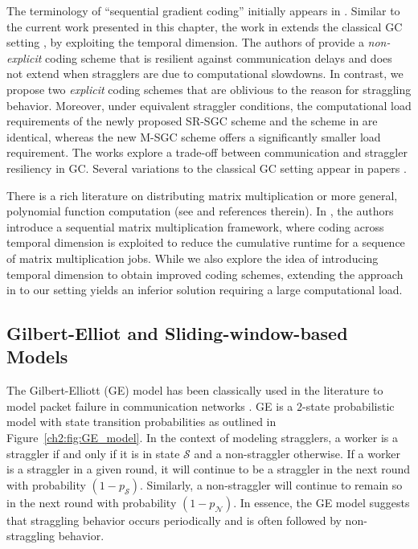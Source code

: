 The terminology of ``sequential gradient coding'' initially appears in \cite{SGC_JSAIT}. Similar to the current work presented in this chapter, the work in \cite{SGC_JSAIT} extends the classical GC setting \cite{grad_coding}, by exploiting the temporal dimension. The authors of \cite{SGC_JSAIT} provide a \textit{non-explicit} coding scheme that is resilient against communication delays and does not extend when stragglers are due to computational slowdowns. In contrast, we propose two \textit{explicit} coding schemes that are oblivious to the reason for straggling behavior. Moreover, under equivalent straggler conditions, the computational load requirements of the newly proposed SR-SGC scheme and the scheme in \cite{SGC_JSAIT} are identical, whereas the new M-SGC scheme offers a significantly smaller load requirement. The works \cite{YeAbbe18, KadheKR20} explore a trade-off between communication and straggler resiliency in GC. Several variations to the classical GC setting appear in papers \cite{RavivEtAl, HalbawiRSH18, WangGTLL19, WangCharlesPap, MaityRM19}.

There is a rich literature on distributing matrix multiplication or more general, polynomial function computation (see \cite{timelycodedcomputing, polycode, Lee16, univdecodablematrices, khatrirao, lagrange, Dutta20, entangledpoly, adityasurvey} and references therein). In \cite{seqmatmult}, the authors introduce a sequential matrix multiplication framework, where coding across temporal dimension is exploited to reduce the cumulative runtime for a sequence of matrix multiplication jobs. While we also explore the idea of introducing temporal dimension to obtain improved coding schemes, extending the approach in \cite{seqmatmult} to our setting yields an inferior solution requiring a large computational load.

\subsection{Gilbert-Elliot and Sliding-window-based Models}

The Gilbert-Elliott (GE) model has been classically used in the literature to model packet failure in communication networks \cite{5755057}. GE is a $2$-state probabilistic model with state transition probabilities as outlined in Figure~\ref{ch2:fig:GE_model}. In the context of modeling stragglers, a worker is a straggler if and only if it is in state $\mathcal{S}$ and a non-straggler otherwise. If a worker is a straggler in a given round, it will continue to be a straggler in the next round with probability $(1-p_\mathcal{S})$. Similarly, a non-straggler will continue to remain so in the next round with probability $(1-p_\mathcal{N})$. In essence, the GE model suggests that straggling behavior occurs periodically and is often followed by non-straggling behavior.

